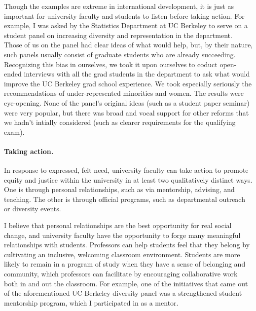Though the examples are extreme in international development, it is just as
important for university faculty and students to listen before taking action.
For example, I was asked by the Statistics Department at UC Berkeley to serve on
a student panel on increasing diversity and representation in the department.
Those of us on the panel had clear ideas of what would help, but, by their
nature, such panels usually consist of graduate students who are already
succeeding. Recognizing this bias in ourselves, we took it upon ourselves to
coduct open-ended interviews with all the grad students in the department to ask
what would improve the UC Berkeley grad school experience.  We took especially
seriously the recommendations of under-represented minorities and women. The
results were eye-opening.  None of the panel's original ideas (such as a student
paper seminar) were very popular, but there was broad and vocal support for
other reforms that we hadn't intially considered (such as clearer requirements
for the qualifying exam).

\paragraph{Taking action.}
%
In response to expressed, felt need, university faculty can take action to
promote equity and justice within the university in at least two qualitatively
distinct ways.  One is through personal relationships, such as via mentorship,
advising, and teaching.  The other is through official programs, such as
departmental outreach or diversity events.

I believe that personal relationships are the best opportunity for real social
change, and university faculty have the opportunity to forge many meaningful
relationships with students.  Professors can help students feel that they belong
by cultivating an inclusive, welcoming classroom environment. Students are more
likely to remain in a program of study when they have a sense of belonging and
community, which professors can facilitate by encouraging collaborative work
both in and out the classroom. For example, one of the initiatives that came out
of the aforementioned UC Berkeley diversity panel was a strengthened student
mentorship program, which I participated in as a mentor.

